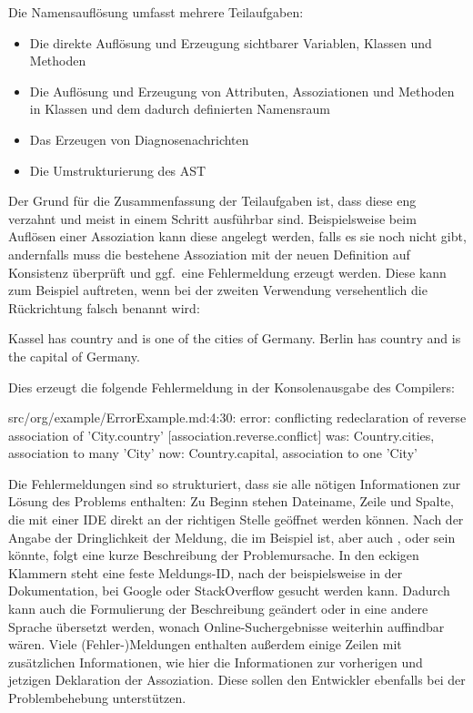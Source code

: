 Die Namensauflösung umfasst mehrere Teilaufgaben:

\begin{itemize}
    \item Die direkte Auflösung und Erzeugung sichtbarer Variablen, Klassen und Methoden
    \item Die Auflösung und Erzeugung von Attributen, Assoziationen und Methoden in Klassen und dem dadurch definierten Namensraum
    \item Das Erzeugen von Diagnosenachrichten
    \item Die Umstrukturierung des AST
\end{itemize}

Der Grund für die Zusammenfassung der Teilaufgaben ist, dass diese eng verzahnt und meist in einem Schritt ausführbar sind.
Beispielsweise beim Auflösen einer Assoziation kann diese angelegt werden, falls es sie noch nicht gibt, andernfalls muss die bestehene Assoziation mit der neuen Definition auf Konsistenz überprüft und ggf.\ eine Fehlermeldung erzeugt werden.
Diese kann zum Beispiel auftreten, wenn bei der zweiten Verwendung versehentlich die Rückrichtung falsch benannt wird:

\begin{codeblock}
    Kassel has country and is one of the cities of Germany.
    Berlin has country and is the capital of Germany.
\end{codeblock}

Dies erzeugt die folgende Fehlermeldung in der Konsolenausgabe des Compilers:

\begin{codeblock}
    src/org/example/ErrorExample.md:4:30: error: conflicting redeclaration of reverse association of 'City.country' [association.reverse.conflict]
    was: Country.cities, association to many 'City'
    now: Country.capital, association to one 'City'
\end{codeblock}

Die Fehlermeldungen sind so strukturiert, dass sie alle nötigen Informationen zur Lösung des Problems enthalten:
Zu Beginn stehen Dateiname, Zeile und Spalte, die mit einer IDE direkt an der richtigen Stelle geöffnet werden können.
Nach der Angabe der Dringlichkeit der Meldung, die im Beispiel  ist, aber auch ,  oder  sein könnte, folgt eine kurze Beschreibung der Problemursache.
In den eckigen Klammern steht eine feste Meldungs-ID, nach der beispielsweise in der Dokumentation, bei Google oder StackOverflow gesucht werden kann.
Dadurch kann auch die Formulierung der Beschreibung geändert oder in eine andere Sprache übersetzt werden, wonach Online-Suchergebnisse weiterhin auffindbar wären.
Viele (Fehler-)Meldungen enthalten außerdem einige Zeilen mit zusätzlichen Informationen, wie hier die Informationen zur vorherigen und jetzigen Deklaration der Assoziation.
Diese sollen den Entwickler ebenfalls bei der Problembehebung unterstützen.

